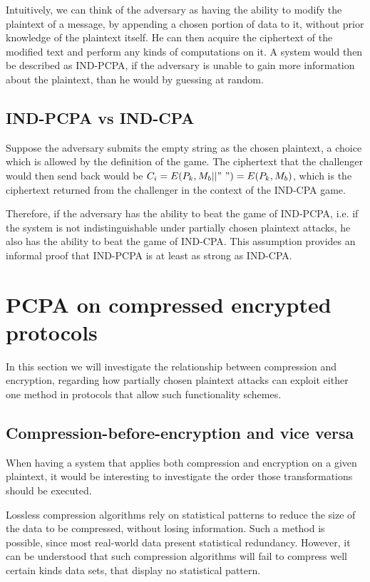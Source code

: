 Intuitively, we can think of the adversary as having the ability to modify the
plaintext of a message, by appending a chosen portion of data to it, without
prior knowledge of the plaintext itself. He can then acquire the ciphertext of
the modified text and perform any kinds of computations on it. A system would
then be described as IND-PCPA, if the adversary is unable to gain more
information about the plaintext, than he would by guessing at random.

\subsection{IND-PCPA vs IND-CPA}

Suppose the adversary submits the empty string as the chosen plaintext, a choice
which is allowed by the definition of the game. The ciphertext that the
challenger would then send back would be \begin{math}C_i = E(P_k, M_b||"\ ") =
E(P_k, M_b)\end{math}, which is the ciphertext returned from the challenger in
the context of the IND-CPA game.

Therefore, if the adversary has the ability to beat the game of IND-PCPA, i.e.
if the system is not indistinguishable under partially chosen plaintext attacks,
he also has the ability to beat the game of IND-CPA. This assumption
provides an informal proof that IND-PCPA is at least as strong as IND-CPA.

\section{PCPA on compressed encrypted protocols}\label{sec:cepcpa}

In this section we will investigate the relationship between compression and
encryption, regarding how partially chosen plaintext attacks can exploit either
one method in protocols that allow such functionality schemes.

\subsection{Compression-before-encryption and vice versa}

When having a system that applies both compression and encryption on a given
plaintext, it would be interesting to investigate the order those
transformations should be executed.

Lossless compression algorithms rely on statistical patterns to reduce the size
of the data to be compressed, without losing information. Such a method is
possible, since most real-world data present statistical redundancy. However, it
can be understood that such compression algorithms will fail to compress well
certain kinds data sets, that display no statistical pattern.

